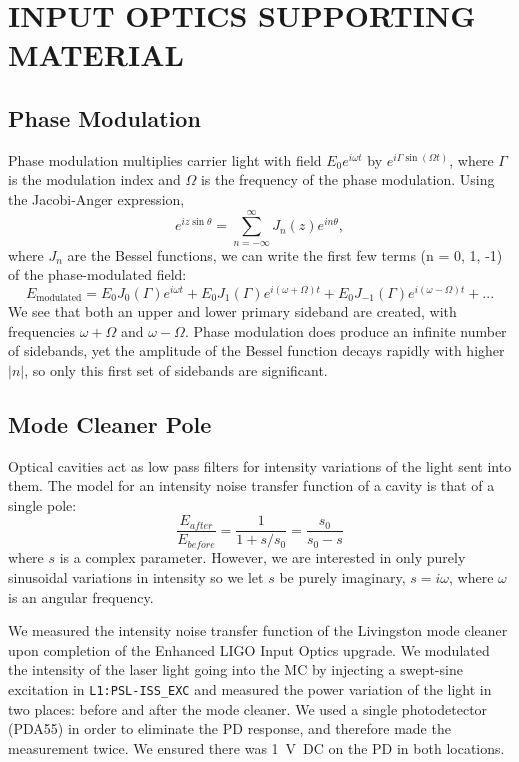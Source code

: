 \chapter{INPUT OPTICS SUPPORTING MATERIAL}


\section{Phase Modulation}
\label{sec:phasemodulation}
Phase modulation multiplies carrier light with field
$E_0e^{i\omega t}$ by $e^{i \Gamma \sin{(\Omega t)}}$, where $\Gamma$
is the modulation index and $\Omega$ is the frequency of the phase
modulation. Using the Jacobi-Anger expression,
\begin{equation}
e^{i z \sin{\theta}} = \sum_{n=-\infty}^{\infty} J_n(z) e^{i n \theta},
\end{equation}
where $J_n$ are the Bessel functions, we can write the first few terms
(n = 0, 1, -1) of the phase-modulated field:
\begin{equation}
E_{\mathrm{modulated}} = E_0 J_0(\Gamma) e^{i\omega t} + E_0 J_1(\Gamma)
e^{i(\omega + \Omega) t} + E_0 J_{-1}(\Gamma)
e^{i(\omega - \Omega) t} + ...
\end{equation}
We see that both an upper and lower primary sideband are created, with
frequencies $\omega + \Omega$ and $\omega - \Omega$. Phase modulation
does produce an infinite number of sidebands, yet the amplitude of the
Bessel function decays rapidly with higher $|n|$, so only this first
set of sidebands are significant.


\section{Mode Cleaner Pole}
\label{sec:MCpole}
Optical cavities act as low pass filters for intensity variations of
the light sent into them. The model for an intensity noise transfer
function of a cavity is that of a single pole:
\begin{equation}
\frac{E_{after}}{E_{before}} = \frac{1}{1 + s/s_0} = \frac{s_0}{s_0 - s}
\end{equation}
where $s$ is a complex parameter. However, we are interested in only
purely sinusoidal variations in intensity so we let $s$ be purely
imaginary, $s=i\omega$, where $\omega$ is an angular frequency.

We measured the intensity noise transfer function of the Livingston
mode cleaner upon completion of the Enhanced LIGO Input Optics
upgrade. We modulated the intensity of the laser light going into the
MC by injecting a swept-sine excitation in \texttt{L1:PSL-ISS\_EXC}
and measured the power variation of the light in two places: before
and after the mode cleaner. We used a single photodetector (PDA55) in
order to eliminate the PD response, and therefore made the measurement
twice. We ensured there was 1~V~DC on the PD in both locations.

